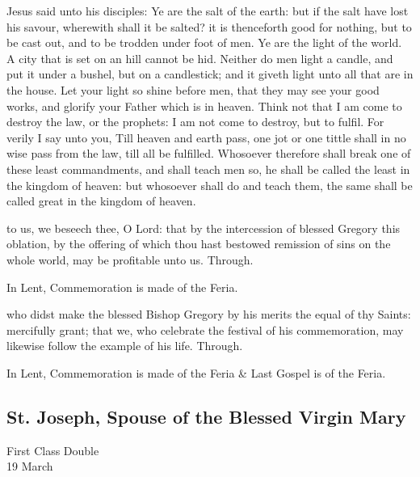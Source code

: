  Jesus said unto his disciples: Ye are the salt of the earth: but if the salt have lost his savour, wherewith shall it be salted? it is thenceforth good for nothing, but to be cast out, and to be trodden under foot of men. Ye are the light of the world. A city that is set on an hill cannot be hid. Neither do men light a candle, and put it under a bushel, but on a candlestick; and it giveth light unto all that are in the house. Let your light so shine before men, that they may see your good works, and glorify your Father which is in heaven. Think not that I am come to destroy the law, or the prophets: I am not come to destroy, but to fulfil. For verily I say unto you, Till heaven and earth pass, one jot or one tittle shall in no wise pass from the law, till all be fulfilled. Whosoever therefore shall break one of these least commandments, and shall teach men so, he shall be called the least in the kingdom of heaven: but whosoever shall do and teach them, the same shall be called great in the kingdom of heaven.


\secret
{} to us, we beseech thee, O Lord: that by the intercession of blessed Gregory this oblation, by the offering of which thou hast bestowed remission of sins on the whole world, may be profitable unto us. Through.
\begin{rubric}
    In Lent, Commemoration is made of the Feria.%
\end{rubric}


\postcommunion
{} who didst make the blessed Bishop Gregory by his merits the equal of thy Saints: mercifully grant; that we, who celebrate the festival of his commemoration, may likewise follow the example of his life. Through.

\begin{rubric}
    In Lent, Commemoration is made of the Feria \& Last Gospel is of the Feria.
\end{rubric}


\clearpage
\subsection{St. Joseph, Spouse of the Blessed Virgin Mary}
\begin{inhead}
    {First Class Double\\
19 March}
\end{inhead}


